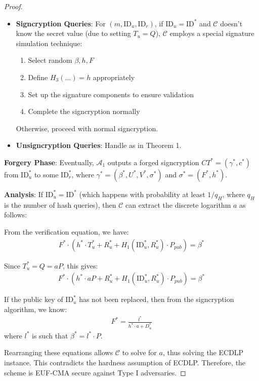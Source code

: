 \documentclass[10pt]{article}
\newtheorem{proof}{Proof}
\begin{document}
\begin{proof}
\begin{itemize}
    \item \textbf{Signcryption Queries}: For $(m, \text{ID}_u, \text{ID}_r)$, if $\text{ID}_u = \text{ID}^*$ and $\mathcal{C}$ doesn't know the secret value (due to setting $T_u = Q$), $\mathcal{C}$ employs a special signature simulation technique:
    \begin{enumerate}
        \item Select random $\beta, h, F$
        \item Define $H_3(...) = h$ appropriately
        \item Set up the signature components to ensure validation
        \item Complete the signcryption normally
    \end{enumerate}
    Otherwise, proceed with normal signcryption.
    
    \item \textbf{Unsigncryption Queries}: Handle as in Theorem 1.
\end{itemize}

\textbf{Forgery Phase}:
Eventually, $\mathcal{A}_1$ outputs a forged signcryption $CT^* = (\gamma^*, c^*)$ from $\text{ID}_u^*$ to some $\text{ID}_r^*$, where $\gamma^* = (\beta^*, U^*, V^*, \sigma^*)$ and $\sigma^* = (F^*, h^*)$.

\textbf{Analysis}:
If $\text{ID}_u^* = \text{ID}^*$ (which happens with probability at least $1/q_H$, where $q_H$ is the number of hash queries), then $\mathcal{C}$ can extract the discrete logarithm $a$ as follows:

From the verification equation, we have:
\begin{align}
F^* \cdot (h^* \cdot T_u^* + R_u^* + H_1(\text{ID}_u^*, R_u^*) \cdot P_{pub}) = \beta^*
\end{align}

Since $T_u^* = Q = aP$, this gives:
\begin{align}
F^* \cdot (h^* \cdot aP + R_u^* + H_1(\text{ID}_u^*, R_u^*) \cdot P_{pub}) = \beta^*
\end{align}

If the public key of $\text{ID}_u^*$ has not been replaced, then from the signcryption algorithm, we know:
\begin{align}
F^* = \frac{l^*}{h^* \cdot a + D_u^*}
\end{align}
where $l^*$ is such that $\beta^* = l^* \cdot P$.

Rearranging these equations allows $\mathcal{C}$ to solve for $a$, thus solving the ECDLP instance. This contradicts the hardness assumption of ECDLP. Therefore, the scheme is EUF-CMA secure against Type I adversaries.
\end{proof}
\end{document}
